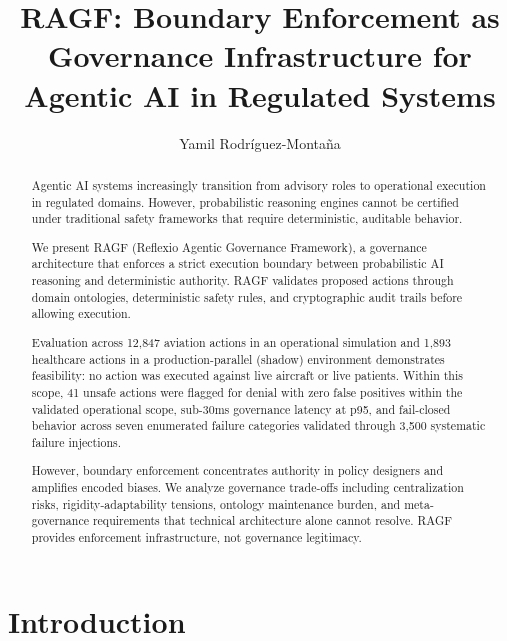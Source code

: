 \documentclass[sigconf,nonacm]{acmart}
\begin{document}
\title{RAGF: Boundary Enforcement as Governance Infrastructure for Agentic AI in Regulated Systems}

\author{Yamil Rodríguez-Montaña}

\begin{abstract}
Agentic AI systems increasingly transition from advisory roles to operational execution in regulated domains. However, probabilistic reasoning engines cannot be certified under traditional safety frameworks that require deterministic, auditable behavior.

We present RAGF (Reflexio Agentic Governance Framework), a governance architecture that enforces a strict execution boundary between probabilistic AI reasoning and deterministic authority. RAGF validates proposed actions through domain ontologies, deterministic safety rules, and cryptographic audit trails before allowing execution.

Evaluation across 12{,}847 aviation actions in an operational simulation and 1{,}893 healthcare actions in a production-parallel (shadow) environment demonstrates feasibility: no action was executed against live aircraft or live patients. Within this scope, 41 unsafe actions were flagged for denial with zero false positives within the validated operational scope, sub-30ms governance latency at p95, and fail-closed behavior across seven enumerated failure categories validated through 3{,}500 systematic failure injections.

However, boundary enforcement concentrates authority in policy designers and amplifies encoded biases. We analyze governance trade-offs including centralization risks, rigidity-adaptability tensions, ontology maintenance burden, and meta-governance requirements that technical architecture alone cannot resolve. RAGF provides enforcement infrastructure, not governance legitimacy.
\end{abstract}


\maketitle

\section{Introduction}
\end{document}
